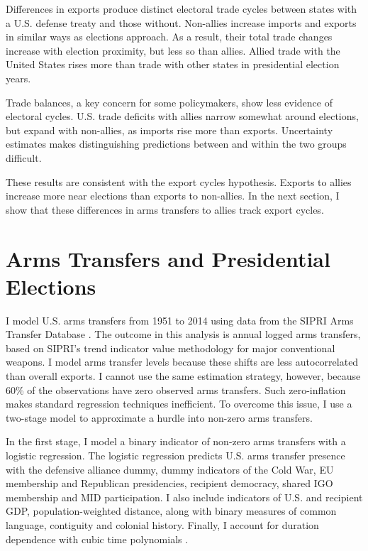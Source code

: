 \documentclass[12pt]{article}
\begin{document}
Differences in exports produce distinct electoral trade cycles between states with a U.S. defense treaty and those without. 
Non-allies increase imports and exports in similar ways as elections approach. 
As a result, their total trade changes increase with election proximity, but less so than allies. 
Allied trade with the United States rises more than trade with other states in presidential election years. 


Trade balances, a key concern for some policymakers, show less evidence of electoral cycles. 
U.S. trade deficits with allies narrow somewhat around elections, but expand with non-allies, as imports rise more than exports. 
Uncertainty estimates makes distinguishing predictions between and within the two groups difficult.


These results are consistent with the export cycles hypothesis. 
Exports to allies increase more near elections than exports to non-allies.
In the next section, I show that these differences in arms transfers to allies track export cycles.



\section{Arms Transfers and Presidential Elections}


I model U.S. arms transfers from 1951 to 2014 using data from the SIPRI Arms Transfer Database \citep{SIPRI2021}.
The outcome in this analysis is annual logged arms transfers, based on SIPRI's trend indicator value methodology for major conventional weapons.
I model arms transfer levels because these shifts are less autocorrelated than overall exports.
I cannot use the same estimation strategy, however, because 60\% of the observations have zero observed arms transfers.
Such zero-inflation makes standard regression techniques inefficient.
To overcome this issue, I use a two-stage model to approximate a hurdle into non-zero arms transfers. 


In the first stage, I model a binary indicator of non-zero arms transfers with a logistic regression. 
The logistic regression predicts U.S. arms transfer presence with the defensive alliance dummy, dummy indicators of the Cold War, EU membership and Republican presidencies, recipient democracy, shared IGO membership and MID participation. 
I also include indicators of U.S. and recipient GDP, population-weighted distance, along with binary measures of common language, contiguity and colonial history. 
Finally, I account for duration dependence with cubic time polynomials \citep{CarterSignorino2010}.
\end{document}
